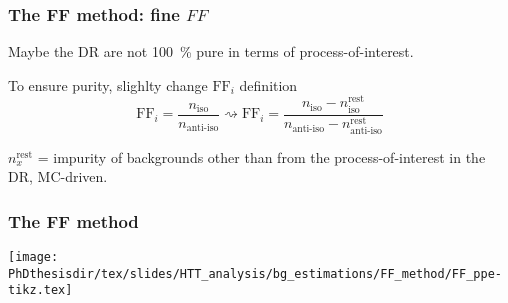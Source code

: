 \begin{frame}
\frametitle{The FF method: fine $\mathit{FF}$}

\manip Maybe the DR are not \SI{100}{\%} pure in terms of process-of-interest.

\manip To ensure purity, slighlty change $\mathrm{FF}_i$ definition
\begin{equation*}
\mathrm{FF}_i = \frac{n_\text{iso}}{n_\text{anti-iso}}
\rightsquigarrow
\mathrm{FF}_i = \frac{n_\text{iso} - n_\text{iso}^\text{rest}}{n_\text{anti-iso} - n_\text{anti-iso}^\text{rest}}
\end{equation*}
\begin{center}
{\small $n_x^\text{rest}$ = impurity of backgrounds other than from the process-of-interest in the DR, MC-driven.}
\end{center}
\end{frame}

\begin{frame}
\frametitle{The FF method}
\begin{center}
\texttt{[image: \\PhDthesisdir/tex/slides/HTT\_analysis/bg\_estimations/FF\_method/FF\_ppe-tikz.tex]}
\end{center}
\end{frame}